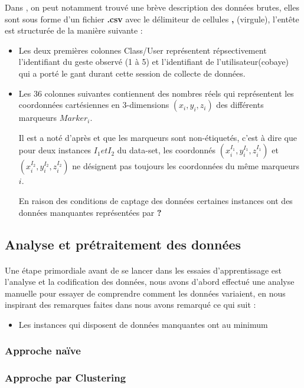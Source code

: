 \par 
Dans \cite{dataset}, on peut notamment trouvé une brève description des données brutes, elles sont sous forme d'un fichier \textbf{.csv} avec le délimiteur de cellules \textbf{,} (virgule), l'entête est structurée  de la manière suivante :
\begin{itemize}
	\item Les deux premières colonnes Class/User représentent répsectivement l'identifiant du geste observé (1 à 5) et l'identifiant de l'utilisateur(cobaye) qui a porté le gant durant cette session de collecte de données.
	\item Les 36 colonnes suivantes contiennent des nombres réels qui représentent les coordonnées cartésiennes en 3-dimensions $(x_i,y_i,z_i)$ des différents marqueurs $Marker_i$. \par Il est a noté d'après \cite{datasetDetails} et \cite{dataset} que les marqueurs sont non-étiquetés, c'est à dire que pour deux instances $I_1 et I_2$ du data-set, les coordonnés $(x_i^{I_1},y_i^{I_1},z_i^{I_1})$ et $(x_i^{I_2},y_i^{I_2},z_i^{I_2})$ ne désignent pas toujours les coordonnées du même marqueurs $i$. \par En raison des conditions de captage des données certaines instances ont des données manquantes représentées par \textbf{?}
\end{itemize}
\subsection{Analyse et prétraitement des données}
\paragraph{}
Une étape primordiale avant de se lancer dans les essaies d'apprentissage est l'analyse et la codification des données, nous avons d'abord effectué une analyse manuelle pour essayer de comprendre comment les données variaient, en nous inspirant des remarques faites dans \cite{datasetDetails} nous avons remarqué ce qui suit : 
\begin{itemize}
	\item Les instances qui disposent de données manquantes ont au minimum 	
\end{itemize}
\subsubsection{Approche naïve}
\paragraph{}
\subsubsection{Approche par Clustering}
\paragraph{}